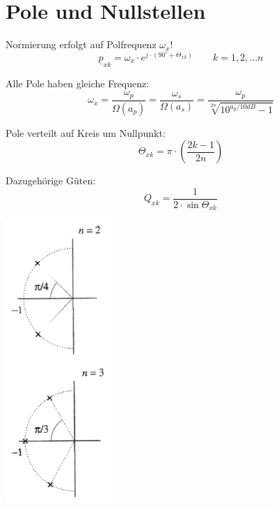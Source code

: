 \documentclass[a4paper, 12pt]{report}
\begin{document}
\section*{Pole und Nullstellen}
	\begin{minipage}[t]{0.6\textwidth}
		\vspace{-5cm}
	    Normierung erfolgt auf Polfrequenz $ \omega_x $!
	    \[ \underline{p}_{xk} = \omega_x \cdot e^{j \cdot (90^{\circ} + \varTheta_{xk})} \qquad k = 1, 2, ... n \]
	    
	    Alle Pole haben gleiche Frequenz:
	    \[ \omega_x = \frac{\omega_p}{\Omega(a_p)} = \frac{\omega_s}{\Omega(a_s)} = \frac{\omega_p}{\sqrt[2n]{10^{a_p / 10dB} - 1}} \]
	    
	    Pole verteilt auf Kreis um Nullpunkt:
	    \[ \varTheta_{xk} = \pi \cdot \left( \frac{2k-1}{2n} \right)  \]
	    
	    Dazugehörige Güten:
	    \[ Q_{xk} = \frac{1}{2 \cdot \sin{\varTheta_{xk}}} \]
	\end{minipage}
   	\begin{minipage}[h]{0.9\textwidth}
   		\vspace{-1cm}
   		\hspace{1cm}
   		\includegraphics[width=0.3\textwidth]{images/butterworth-pole.png}
   	\end{minipage}
   	   	
\clearpage
\end{document}
